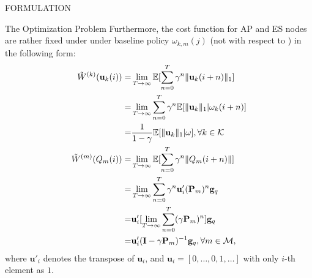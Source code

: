 \documentclass[10pt, conference, letterpaper]{IEEEtran}
\newcommand{\mat}{\mathbf}
\renewcommand{\vec}{\mathbf}
\DeclarePairedDelimiter{\Inorm}{\|}{\|_1}
\newcommand{\apSet}{\mathcal{K}}
\newcommand{\esSet}{\mathcal{M}}
\begin{document}
\begin{section}{FORMULATION}
\begin{subsection}{The Optimization Problem}
            Furthermore, the cost function for AP and ES nodes are rather fixed under under baseline policy $\omega_{k,m}(j)$ (not with respect to ) in the following form:
            \begin{align}
                \tilde{W}^{(k)}(\vec{u}_k(i)) =& \lim_{T\to\infty} \mathbb{E}[\sum_{n=0}^{T} \gamma^{n} \Inorm{\vec{u}_k(i+n)}]
                \nonumber\\
                =& \lim_{T\to\infty} \sum_{n=0}^{T} \gamma^{n} \mathbb{E}[\Inorm{\vec{u}_k}|\omega_k(i+n)]
                \nonumber\\
                =& \frac{1}{1-\gamma} \mathbb{E}[\Inorm{\vec{u}_k}|\omega], \forall k\in\apSet
                \\
                \tilde{W}^{(m)}(Q_m(i)) =& \lim_{T\to\infty} \mathbb{E}[\sum_{n=0}^{T} \gamma^{n} \|Q_m(i+n)\|]
                \nonumber\\
                =& \lim_{T\to\infty} \sum_{n=0}^{T} \gamma^{n} \vec{u}'_i (\mat{P}_m)^{n} \vec{g}_q
                \nonumber\\
                =& \vec{u}'_i [\lim_{T\to\infty} \sum_{n=0}^{T} (\gamma \mat{P}_m)^{n}] \vec{g}_q
                \nonumber\\
                =& \vec{u}'_i (\mat{I} - \gamma \mat{P}_m)^{-1} \vec{g}_q, \forall m\in\esSet,
            \end{align}
            where $\vec{u}'_i$ denotes the transpose of $\vec{u}_i$, and $\vec{u}_i = [0,\dots,0,1,\dots]$ with only $i$-th element as $1$.
        \end{subsection}
    \end{section}
\end{document}
